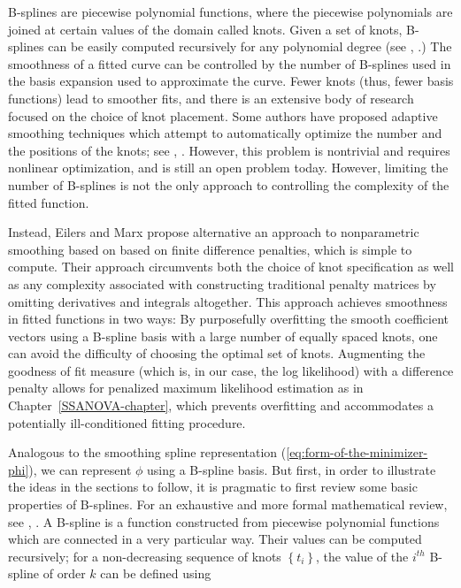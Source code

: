 B-splines are piecewise polynomial functions, where the piecewise polynomials are joined at certain values of the domain called knots. Given a set of knots, B-splines can be easily computed recursively for any polynomial degree (see \cite{de1978practical}, \cite{dierckx1995curve}.) The smoothness of a fitted curve can be controlled by the number of B-splines used in the basis expansion used to approximate the curve. Fewer knots (thus, fewer basis functions) lead to smoother fits, and there is an extensive body of research focused on the choice of knot placement. Some authors have proposed adaptive smoothing techniques which attempt to automatically optimize the number and the positions of the knots; see \cite{friedman1989flexible}, \cite{kooperberg1991study}. However, this problem is nontrivial and requires nonlinear optimization, and is still an open problem today. However, limiting the number of B-splines is not the only approach to controlling the complexity of the fitted function.

\bigskip

Instead, Eilers and Marx propose alternative an approach to nonparametric smoothing based on based on finite difference penalties, which is simple to compute. Their approach circumvents both the choice of knot specification as well as any complexity associated with constructing traditional penalty matrices by omitting derivatives and integrals altogether.  This approach achieves smoothness in fitted functions in two ways: By purposefully overfitting the smooth coefficient vectors using a B-spline basis with a large number of equally spaced knots, one can avoid the difficulty of choosing the optimal set of knots.  Augmenting the goodness of fit measure (which is, in our case, the log likelihood) with a difference penalty allows for penalized maximum likelihood estimation as in Chapter~\ref{SSANOVA-chapter}, which prevents overfitting and accommodates a potentially ill-conditioned fitting procedure. 

\bigskip

Analogous to the smoothing spline representation (\ref{eq:form-of-the-minimizer-phi}), we can represent $\phi$ using a B-spline basis. But first, in order to illustrate the ideas in the sections to follow, it is pragmatic to first review some basic properties of B-splines. For an exhaustive and more formal mathematical review, see  \cite{de1978practical}, \cite{dierckx1995curve}. A B-spline is a function constructed from piecewise polynomial functions which are connected in a very particular way. Their values can be computed recursively; for a non-decreasing sequence of knots $\left\{t_i\right\}$, the value of the $i^{th}$ B-spline of order $k$ can be defined using

